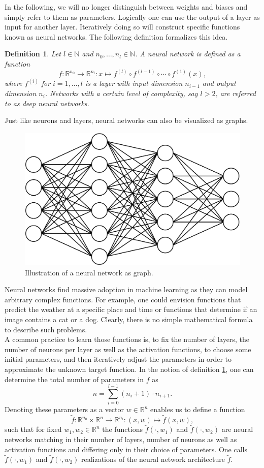 \documentclass[11pt, a4paper]{article}
\newtheorem{definition}[theorem]{Definition}
\newcommand{\N}{\mathbb{N}}
\newcommand{\R}{\mathbb{R}}
\begin{document}
In the following, we will no longer distinguish between weights and biases and simply refer to them as parameters. Logically one can use the output of a layer as input for another layer. Iteratively doing so will construct specific functions known as neural networks. The following definition formalizes this idea. \\

\begin{definition} \label{def:network}
Let $l \in \N$ and $n_0, \dots, n_l \in \N$. A neural network is defined as a function
\[ f : \R^{n_0} \to \R^{n_l} : x \mapsto f^{(l)} \circ f^{(l-1)} \circ \cdots \circ f^{(1)} (x),\]
where $f^{(i)}$ for $i=1, \dots, l$ is a layer with input dimension $n_{i-1}$ and output dimension $n_i$. Networks with a certain level of complexity, say $l>2$, are referred to as deep neural networks.
\end{definition}

Just like neurons and layers, neural networks can also be visualized as graphs.

\begin{figure}[!h]
\centering
\includegraphics[width=0.6\linewidth]{images/network.png}
\caption{Illustration of a neural network as graph.}
\label{fig:neuron}
\end{figure}  

Neural networks find massive adoption in machine learning as they can model arbitrary complex functions. For example, one could envision functions that predict the weather at a specific place and time or functions that determine if an image contains a cat or a dog. Clearly, there is no simple mathematical formula to describe such problems. \\

A common practice to learn those functions is, to fix the number of layers, the number of neurons per layer as well as the activation functions, to choose some initial parameters, and then iteratively adjust the parameters in order to approximate the unknown target function. In the notion of definition \ref{def:network}, one can determine the total number of parameters in $f$ as
\[ n = \sum_{i=0}^{l-1} (n_i + 1) \cdot n_{i+1}. \]
Denoting these parameters as a vector $w \in \R^n$ enables us to define a function
\[ \tilde{f} : \R^{n_0} \times \R^n \to \R^{n_l} : (x,w) \mapsto \tilde{f}(x,w), \]
such that for fixed $w_1, w_2 \in \R^n$ the functions $\tilde{f}(\cdot,w_1)$ and $\tilde{f}(\cdot,w_2)$ are neural networks matching in their number of layers, number of neurons as well as activation functions and differing only in their choice of parameters. One calls $\tilde{f}(\cdot,w_1)$ and $\tilde{f}(\cdot,w_2)$ realizations of the neural network architecture $\tilde{f}$. \\
\end{document}
